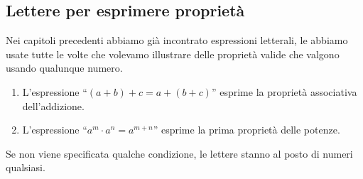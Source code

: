 
\subsection{Lettere per esprimere proprietà}
\label{subsec:calclett_proprieta}

Nei capitoli precedenti abbiamo già incontrato espressioni letterali, 
le abbiamo usate tutte le volte che volevamo illustrare delle proprietà 
valide che valgono usando qualunque numero. 

\begin{esempio}{}{}
\begin{enumerate} [nosep]
\item 
L'espressione ``\((a+b)+c=a+(b+c)\)'' esprime la proprietà 
associativa dell'addizione. 
\item 
L'espressione ``\(a^m \cdot a^n = a^{m + n}\)'' esprime la prima 
proprietà delle potenze. 
\end{enumerate}
Se non viene specificata qualche condizione, le lettere stanno al posto 
di numeri qualsiasi.
\end{esempio}


